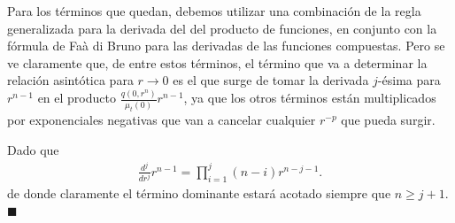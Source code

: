 Para los términos que quedan, debemos utilizar una combinación de la regla generalizada 
para la derivada del 
del producto de funciones, en conjunto con la fórmula de Faà di Bruno 
para las derivadas de las funciones compuestas. Pero se ve claramente que, de entre estos términos, el término 
que va a determinar la relación asintótica para $r \to 0$ es el que surge de 
tomar la derivada $j$-ésima para $r^{n-1}$ en el producto $\frac{q(0,r^n)}{\mu_t(0)}r^{n-1}$, ya que los otros términos están multiplicados por exponenciales negativas 
que van a cancelar cualquier $r^{-p}$ que pueda surgir. 

Dado que 
\begin{equation}
\begin{split}
\frac{d^j }{dr^j} r^{n-1}= \prod_{i=1}^j (n-i)r^{n-j-1}.
\end{split}
\label{eq:derivadasj3}
\end{equation}
de donde claramente el término dominante estará acotado siempre que 
$n\ge j+1$. $\blacksquare$

\pagestyle{empty}

